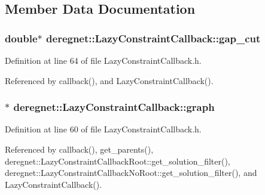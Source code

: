 \subsection{Member Data Documentation}
\subsubsection[{\texorpdfstring{gap\+\_\+cut}{gap_cut}}]{\setlength{\rightskip}{0pt plus 5cm}double$\ast$ deregnet\+::\+Lazy\+Constraint\+Callback\+::gap\+\_\+cut\hspace{0.3cm}{\ttfamily [protected]}}\hypertarget{classderegnet_1_1LazyConstraintCallback_a6a139307165523fa944e393e01aeec47}{}\label{classderegnet_1_1LazyConstraintCallback_a6a139307165523fa944e393e01aeec47}


Definition at line 64 of file Lazy\+Constraint\+Callback.\+h.



Referenced by callback(), and Lazy\+Constraint\+Callback().

\subsubsection[{\texorpdfstring{graph}{graph}}]{$\ast$ deregnet\+::\+Lazy\+Constraint\+Callback\+::graph\hspace{0.3cm}{\ttfamily [protected]}}\hypertarget{classderegnet_1_1LazyConstraintCallback_af481c9d68dea2dab035e1f2f79cda4d5}{}\label{classderegnet_1_1LazyConstraintCallback_af481c9d68dea2dab035e1f2f79cda4d5}


Definition at line 60 of file Lazy\+Constraint\+Callback.\+h.



Referenced by callback(), get\+\_\+parents(), deregnet\+::\+Lazy\+Constraint\+Callback\+Root\+::get\+\_\+solution\+\_\+filter(), deregnet\+::\+Lazy\+Constraint\+Callback\+No\+Root\+::get\+\_\+solution\+\_\+filter(), and Lazy\+Constraint\+Callback().

